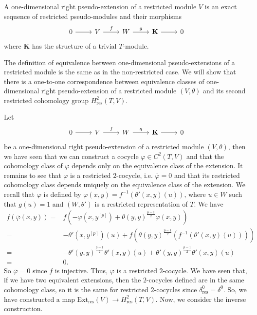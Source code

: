 \documentclass[11pt, twoside]{article}
\begin{document}
\begin{defi}
A one-dimensional right pseudo-extension of a restricted module $V$ is an exact sequence of restricted pseudo-modules and their morphisms \[\begin{tikzcd}
	0 & V & W & {\mathbf{K}} & 0
	\arrow[from=1-1, to=1-2]
	\arrow["f", from=1-2, to=1-3]
	\arrow["g", from=1-3, to=1-4]
	\arrow[from=1-4, to=1-5]
\end{tikzcd}\] where $\mathbf{K}$ has the structure of a trivial $T$-module.
\end{defi} 

The definition of equivalence between one-dimensional pseudo-extensions of a restricted module is the same as in the non-restricted case. We will show that there is a one-to-one correspondence between equivalence classes of one-dimensional right pseudo-extension of a restricted module $(V,\theta)$ and its second restricted cohomology group $H^2_\mathrm{res}(T,V) $.

Let \[\begin{tikzcd}
	0 & V & W & {\mathbf{K}} & 0
	\arrow[from=1-1, to=1-2]
	\arrow["f", from=1-2, to=1-3]
	\arrow["g", from=1-3, to=1-4]
	\arrow[from=1-4, to=1-5]
\end{tikzcd}\] be a one-dimensional right pseudo-extension of a restricted module $(V,\theta)$, then we have seen that we can construct a cocycle $\varphi\in C^2(T,V) $ and that the cohomology class of $\varphi$ depends only on the equivalence class of the extension. It remains to see that $\varphi $ is a restricted $2$-cocycle, i.e. $\overline{\varphi}=0 $ and that its restricted cohomology class depends uniquely on the equivalence class of the extension. We recall that $\varphi$ is defined by $\varphi(x,y)=f^{-1}(\theta'(x,y)(u)) $, where $u\in W $ such that $g(u)=1$ and $(W,\theta') $ is a restricted representation of $T$. We have  \begin{align*}
   f( \overline{\varphi}(x,y))=&f( -\varphi(x,y^{[p]})+ \theta(y,y)^{\frac{p-1}{2}}\varphi(x,y))\\ =& -\theta'(x,y^{[p]})(u)+ f(\theta(y,y)^\frac{p-1}{2}(f^{-1}(\theta'(x,y)(u))))\\ =& -\theta'(y,y)^\frac{p-1}{2}\theta'(x,y)(u) +  \theta'(y,y)^\frac{p-1}{2}\theta'(x,y)(u)\\ =& 0.
\end{align*} So $\overline{\varphi}=0$ since $f$ is injective. Thus, $\varphi $ is a restricted $2$-cocycle. We have seen that, if we have two equivalent extensions, then the $2$-cocycles defined are in the same cohomology class, so it is the same for  restricted $2$-cocycles since $\delta^0_\mathrm{res}=\delta^0 $. So, we have constructed a map $\mathrm{Ext}_\mathrm{res}(V)\to H^2_\mathrm{res}(T,V) $. Now, we consider the inverse construction. 
\end{document}
